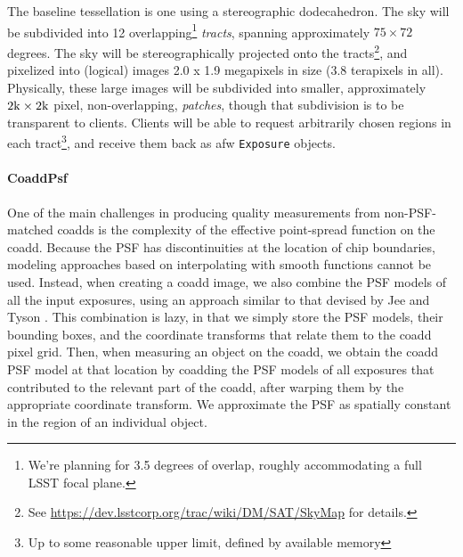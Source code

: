 \documentclass[12pt]{article}
\begin{document}
The baseline tessellation is one using a stereographic dodecahedron. The sky will be subdivided into 12 overlapping\footnote{We're planning for 3.5 degrees of overlap, roughly accommodating a full LSST focal plane.} {\em tracts}, spanning approximately $75 \times 72$ degrees. The sky will be stereographically projected onto the tracts\footnote{See \url{https://dev.lsstcorp.org/trac/wiki/DM/SAT/SkyMap} for details.}, and pixelized into (logical) images 2.0 x 1.9 megapixels in size (3.8 terapixels in all). Physically, these large images will be subdivided into smaller, approximately $2{\rm k} \times 2{\rm k}$ pixel, non-overlapping, {\em patches}, though that subdivision is to be transparent to clients. Clients will be able to request arbitrarily chosen regions in each tract\footnote{Up to some reasonable upper limit, defined by available memory}, and receive them back as afw {\tt Exposure} objects.

\paragraph{CoaddPsf}
\label{alg:coaddPsf}

One of the main challenges in producing quality measurements from
non-PSF-matched coadds is the complexity of the effective point-spread
function on the coadd.  Because the PSF has discontinuities at the
location of chip boundaries, modeling approaches based on
interpolating with smooth functions cannot be used.  Instead, when
creating a coadd image, we also combine the PSF models of all the
input exposures, using an approach similar to that devised by
Jee and Tyson \cite{JeeTyson11}.  This combination is lazy, in that we simply store the
PSF models, their bounding boxes, and the coordinate transforms that
relate them to the coadd pixel grid.  Then, when measuring an object
on the coadd, we obtain the coadd PSF model at that location by coadding the
PSF models of all exposures that contributed to the relevant part of
the coadd, after warping them by the appropriate coordinate
transform.  We approximate the PSF as spatially constant in the region
of an individual object.
\end{document}

